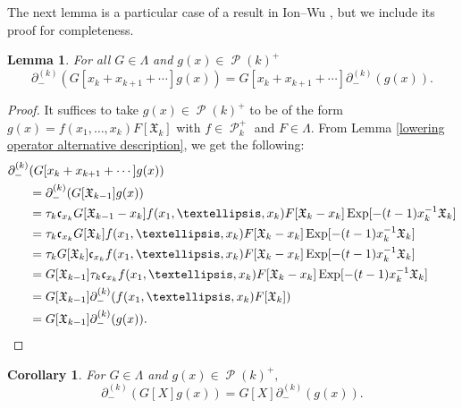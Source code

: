 \documentclass[11pt]{article}
\newtheorem{lemm}[theo]{Lemma}
\newtheorem{coro}[theo]{Corollary}
\theoremstyle{definition}
\numberwithin{equation}{section}
\DeclareMathOperator{\sP}{\mathscr{P} }
\DeclareMathOperator{\EXP}{\mathrm{Exp}}
\begin{document}
The next lemma is a particular case of a result in Ion--Wu \cite[Section 7, (7.8), page 35]{Ion_2022}, but we include its proof for completeness.

\begin{lemm}\label{lowering is a partial sym module map}
For all $G \in \Lambda$ and $g(x) \in \sP(k)^{+}$ 
$$ \partial_{-}^{(k)}(G[x_k + x_{k+1}+ \cdots]g(x)) = G[x_k + x_{k+1}+ \cdots] \partial_{-}^{(k)}(g(x)).$$
\end{lemm}

\begin{proof}
It suffices to take $g(x) \in \sP(k)^{+}$ to be of the form $g(x) = f(x_1,\ldots,x_k)F[\mathfrak{X}_{k}]$ with $f\in \sP_{k}^{+}$ and $F \in \Lambda$.
From Lemma \ref{lowering operator alternative description}, we get the following:
\begin{align*}
\partial_{-}^{(k)}&(G[x_k + x_{k+1}+ \cdots]g(x)) \\ 
&= \partial_{-}^{(k)}(G[\mathfrak{X}_{k-1}]g(x)) \\
&= \tau_k \mathfrak{c}_{x_k} G[\mathfrak{X}_{k-1}-x_k] f(x_1,\ldots,x_k)F[\mathfrak{X}_{k} - x_k]\EXP[-(t-1)x_k^{-1}\mathfrak{X}_{k}] \\
&= \tau_k \mathfrak{c}_{x_k} G[\mathfrak{X}_{k}] f(x_1,\ldots,x_k)F[\mathfrak{X}_{k} - x_k]\EXP[-(t-1)x_k^{-1}\mathfrak{X}_{k}] \\
&= \tau_kG[\mathfrak{X}_{k}]\mathfrak{c}_{x_k}f(x_1,\ldots,x_k)F[\mathfrak{X}_{k} - x_k]\EXP[-(t-1)x_k^{-1}\mathfrak{X}_{k}]\\
&= G[\mathfrak{X}_{k-1}]\tau_k\mathfrak{c}_{x_k}f(x_1,\ldots,x_k)F[\mathfrak{X}_{k} - x_k]\EXP[-(t-1)x_k^{-1}\mathfrak{X}_{k}]\\
&= G[\mathfrak{X}_{k-1}]\partial_{-}^{(k)}(f(x_1,\ldots,x_k)F[\mathfrak{X}_{k}]) \\
&= G[\mathfrak{X}_{k-1}]\partial_{-}^{(k)}(g(x)). \qedhere
\end{align*}    
\end{proof}

\begin{coro}\label{lowering is a sym module map}
    For $G \in \Lambda$ and $g(x) \in \sP(k)^{+},$
    $$\partial_{-}^{(k)}(G[X]g(x)) = G[X] \partial_{-}^{(k)}(g(x)).$$
\end{coro}
\end{document}
